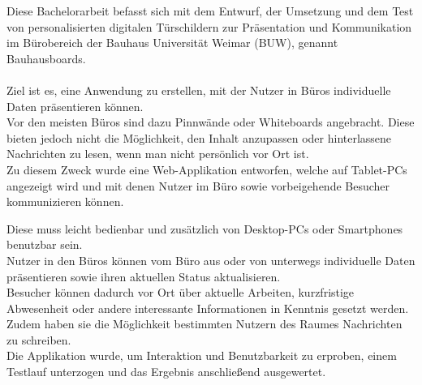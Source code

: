 Diese Bachelorarbeit befasst sich mit dem Entwurf, der Umsetzung und dem Test von personalisierten
digitalen Türschildern zur Präsentation und Kommunikation im Bürobereich der Bauhaus Universität Weimar (BUW), genannt Bauhausboards.
\\\\
Ziel ist es, eine Anwendung zu erstellen, mit der Nutzer in Büros individuelle Daten präsentieren können.
\\
Vor den meisten Büros sind dazu Pinnwände oder Whiteboards angebracht.
Diese bieten jedoch nicht die Möglichkeit, den Inhalt anzupassen oder hinterlassene Nachrichten zu lesen, wenn man nicht persönlich vor Ort ist.
\\
Zu diesem Zweck wurde eine Web-Applikation entworfen, welche auf Tablet-PCs angezeigt wird und mit denen Nutzer im Büro sowie vorbeigehende Besucher kommunizieren können.

Diese muss leicht bedienbar und zusätzlich von Desktop-PCs oder Smartphones benutzbar sein.
\\
Nutzer in den Büros können vom Büro aus oder von unterwegs individuelle Daten präsentieren sowie ihren aktuellen Status aktualisieren.
\\
Besucher können dadurch vor Ort über aktuelle Arbeiten, kurzfristige Abwesenheit oder andere interessante Informationen in Kenntnis gesetzt werden.
Zudem haben sie die Möglichkeit bestimmten Nutzern des Raumes Nachrichten zu schreiben.
\\
Die Applikation wurde, um Interaktion und Benutzbarkeit zu erproben, einem Testlauf unterzogen und das Ergebnis anschließend ausgewertet.